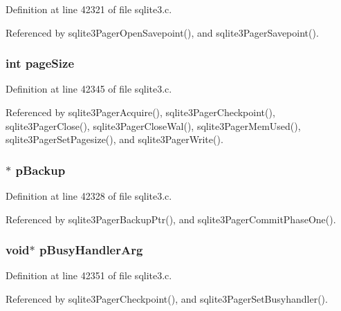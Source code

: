 Definition at line 42321 of file sqlite3.\+c.



Referenced by sqlite3\+Pager\+Open\+Savepoint(), and sqlite3\+Pager\+Savepoint().

\hypertarget{struct_pager_a0f8fcbb2d8136c7d33c2e72f3642d6f2}{}
\subsubsection[{page\+Size}]{\setlength{\rightskip}{0pt plus 5cm}int page\+Size}\label{struct_pager_a0f8fcbb2d8136c7d33c2e72f3642d6f2}


Definition at line 42345 of file sqlite3.\+c.



Referenced by sqlite3\+Pager\+Acquire(), sqlite3\+Pager\+Checkpoint(), sqlite3\+Pager\+Close(), sqlite3\+Pager\+Close\+Wal(), sqlite3\+Pager\+Mem\+Used(), sqlite3\+Pager\+Set\+Pagesize(), and sqlite3\+Pager\+Write().

\hypertarget{struct_pager_aedd6a6ec27f63296ae65625d51b49f54}{}
\subsubsection[{p\+Backup}]{$\ast$ p\+Backup}\label{struct_pager_aedd6a6ec27f63296ae65625d51b49f54}


Definition at line 42328 of file sqlite3.\+c.



Referenced by sqlite3\+Pager\+Backup\+Ptr(), and sqlite3\+Pager\+Commit\+Phase\+One().

\hypertarget{struct_pager_a9000362142a6d1a15587cdd9534c2213}{}
\subsubsection[{p\+Busy\+Handler\+Arg}]{\setlength{\rightskip}{0pt plus 5cm}void$\ast$ p\+Busy\+Handler\+Arg}\label{struct_pager_a9000362142a6d1a15587cdd9534c2213}


Definition at line 42351 of file sqlite3.\+c.



Referenced by sqlite3\+Pager\+Checkpoint(), and sqlite3\+Pager\+Set\+Busyhandler().


